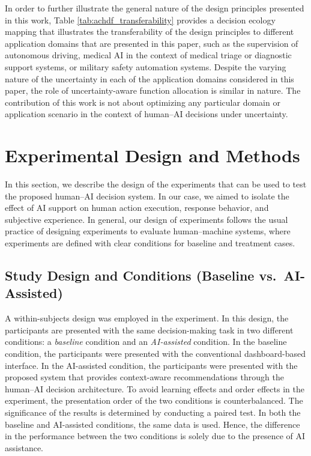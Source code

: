 \documentclass[journal]{IEEEtran}
\theoremstyle{plain}
\theoremstyle{definition}
\begin{document}
In order to further illustrate the general nature of the design principles presented in this work, Table \ref{tab:achdf_transferability} provides a decision ecology mapping that illustrates the transferability of the design principles to different application domains that are presented in this paper, such as the supervision of autonomous driving, medical AI in the context of medical triage or diagnostic support systems, or military safety automation systems. Despite the varying nature of the uncertainty in each of the application domains considered in this paper, the role of uncertainty-aware function allocation is similar in nature.
The contribution of this work is not about optimizing any particular domain or application scenario in the context of human--AI decisions under uncertainty.

    \section{Experimental Design and Methods}

    In this section, we describe the design of the experiments that can be used to test the proposed human--AI decision system. In our case, we aimed to isolate the effect of AI support on human action execution, response behavior, and subjective experience. In general, our design of experiments follows the usual practice of designing experiments to evaluate human--machine systems, where experiments are defined with clear conditions for baseline and treatment cases.

    \subsection{Study Design and Conditions (Baseline vs.\ AI-Assisted)}

    A within-subjects design was employed in the experiment. In this design, the participants are presented with the same decision-making task in two different conditions: a \emph{baseline} condition and an \emph{AI-assisted} condition. In the baseline condition, the participants were presented with the conventional dashboard-based interface. In the AI-assisted condition, the participants were presented with the proposed system that provides context-aware recommendations through the human--AI decision architecture.
    To avoid learning effects and order effects in the experiment, the presentation order of the two conditions is counterbalanced. The significance of the results is determined by conducting a paired test.
    In both the baseline and AI-assisted conditions, the same data is used. Hence, the difference in the performance between the two conditions is solely due to the presence of AI assistance.
\end{document}
